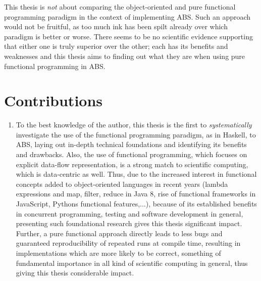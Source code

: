 This thesis is \textit{not} about comparing the object-oriented and pure functional programming paradigm in the context of implementing ABS. Such an approach would not be fruitful, as too much ink has been spilt already over which paradigm is better or worse. There seems to be no scientific evidence supporting that either one is truly superior over the other; each has its benefits and weaknesses and this thesis aims to finding out what they are when using pure functional programming in ABS.

\section{Contributions}
\begin{enumerate}
	\item To the best knowledge of the author, this thesis is the first to \textit{systematically} investigate the use of the functional programming paradigm, as in Haskell, to ABS, laying out in-depth technical foundations and identifying its benefits and drawbacks. Also, the use of functional programming, which focuses on explicit data-flow representation, is a strong match to scientific computing, which is data-centric as well. Thus, due to the increased interest in functional concepts added to object-oriented languages in recent years (lambda expressions and map, filter, reduce in Java 8, rise of functional frameworks in JavaScript, Pythons functional features,...), because of its established benefits in concurrent programming, testing and software development in general, presenting such foundational research gives this thesis significant impact. Further, a pure functional approach directly leads to less bugs and guaranteed reproducibility of repeated runs at compile time, resulting in implementations which are more likely to be correct, something of fundamental importance in all kind of scientific computing in general, thus giving this thesis considerable impact.
	

\end{enumerate}
